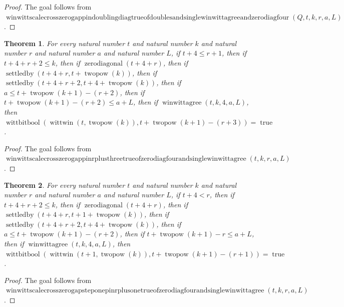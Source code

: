 \documentclass[11pt]{article}
\newtheorem{theorem}{Theorem}[section]
\theoremstyle{definition}
\begin{document}
\begin{proof}
The goal follows from \(\operatorname{winwittscalecrosszerogappindoublingdiagtrueofdoublesandsinglewinwittagreeandzerodiagfour}(Q, t, k, r, a, L)\).
\end{proof}
\begin{theorem}
\label{ll:paper:winwitt-scale-cross-zero-gap-pin-r-plus-three-true-of-zero-diag-four-and-single-winwittagree}
For every natural number \(t\) and natural number \(k\) and natural number \(r\) and natural number \(a\) and natural number \(L\), if \(t + 4 \le r + 1\), then if \(t + 4 + r + 2 \le k\), then if \(\operatorname{zerodiagonal}(t + 4 + r)\), then if \(\operatorname{settledby}(t + 4 + r, t + \operatorname{twopow}(k))\), then if \(\operatorname{settledby}(t + 4 + r + 2, t + 4 + \operatorname{twopow}(k))\), then if \(a \le t + \operatorname{twopow}(k + 1) - (r + 2)\), then if \(t + \operatorname{twopow}(k + 1) - (r + 2) \le a + L\), then if \(\operatorname{winwittagree}(t, k, 4, a, L)\), then \(\operatorname{wittbitbool}(\operatorname{wittwin}(t, \operatorname{twopow}(k)), t + \operatorname{twopow}(k + 1) - (r + 3)) = \operatorname{true}\).
\end{theorem}
\begin{proof}
The goal follows from \(\operatorname{winwittscalecrosszerogappinrplusthreetrueofzerodiagfourandsinglewinwittagree}(t, k, r, a, L)\).
\end{proof}
\begin{theorem}
\label{ll:paper:winwitt-scale-cross-zero-gap-step-one-pin-r-plus-one-true-of-zero-diag-four-and-single-winwittagree}
For every natural number \(t\) and natural number \(k\) and natural number \(r\) and natural number \(a\) and natural number \(L\), if \(t + 4 < r\), then if \(t + 4 + r + 2 \le k\), then if \(\operatorname{zerodiagonal}(t + 4 + r)\), then if \(\operatorname{settledby}(t + 4 + r, t + 1 + \operatorname{twopow}(k))\), then if \(\operatorname{settledby}(t + 4 + r + 2, t + 4 + \operatorname{twopow}(k))\), then if \(a \le t + \operatorname{twopow}(k + 1) - (r + 2)\), then if \(t + \operatorname{twopow}(k + 1) - r \le a + L\), then if \(\operatorname{winwittagree}(t, k, 4, a, L)\), then \(\operatorname{wittbitbool}(\operatorname{wittwin}(t + 1, \operatorname{twopow}(k)), t + \operatorname{twopow}(k + 1) - (r + 1)) = \operatorname{true}\).
\end{theorem}
\begin{proof}
The goal follows from \(\operatorname{winwittscalecrosszerogapsteponepinrplusonetrueofzerodiagfourandsinglewinwittagree}(t, k, r, a, L)\).
\end{proof}
\end{document}
